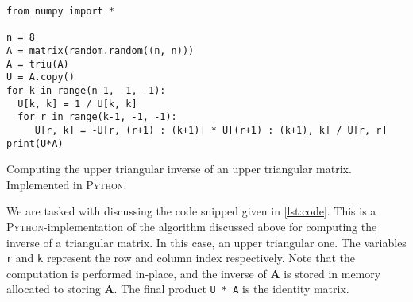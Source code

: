 \documentclass[12pt, oneside, a4paper, article]{memoir}
\newcommand{\mat}[1]{\boldsymbol{#1}}
\begin{document}
    \begin{listing}
        \begin{verbatim}
from numpy import *

n = 8
A = matrix(random.random((n, n)))
A = triu(A)
U = A.copy()
for k in range(n-1, -1, -1):
  U[k, k] = 1 / U[k, k]
  for r in range(k-1, -1, -1):
     U[r, k] = -U[r, (r+1) : (k+1)] * U[(r+1) : (k+1), k] / U[r, r]
print(U*A)
        \end{verbatim}
        \caption{Computing the upper triangular inverse of an upper triangular
        matrix. Implemented in \textsc{Python}.}
        \label{lst:code}
    \end{listing}
    We are tasked with discussing the code snipped given in \cref{lst:code}.
    This is a \textsc{Python}-implementation of the algorithm discussed above for
    computing the inverse of a triangular matrix. In this case, an upper
    triangular one. The variables \texttt{r} and \texttt{k} represent the row
    and column index respectively. Note that the computation is performed
    in-place, and the inverse of \( \mat{A} \) is stored in memory allocated to
    storing \( \mat{A} \). The final product \texttt{U * A} is the identity
    matrix.
 
\end{document}
